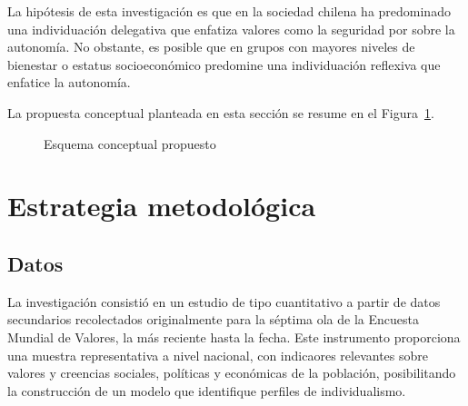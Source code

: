 \documentclass[
  12pt,
  letterpaper,
  DIV=11,
  numbers=noendperiod]{scrartcl}
\begin{document}
La hipótesis de esta investigación es que en la sociedad chilena ha
predominado una individuación delegativa que enfatiza valores como la
seguridad por sobre la autonomía. No obstante, es posible que en grupos
con mayores niveles de bienestar o estatus socioeconómico predomine una
individuación reflexiva que enfatice la autonomía.

La propuesta conceptual planteada en esta sección se resume en el
Figura~\ref{fig-esquema}.

\begin{figure}[H]


\caption{\label{fig-esquema}Esquema conceptual propuesto}

\end{figure}%

\section{Estrategia metodológica}\label{estrategia-metodoluxf3gica}

\subsection{Datos}\label{datos}

La investigación consistió en un estudio de tipo cuantitativo a partir
de datos secundarios recolectados originalmente para la séptima ola de
la Encuesta Mundial de Valores, la más reciente hasta la fecha. Este
instrumento proporciona una muestra representativa a nivel nacional, con
indicaores relevantes sobre valores y creencias sociales, políticas y
económicas de la población, posibilitando la construcción de un modelo
que identifique perfiles de individualismo.
\end{document}

